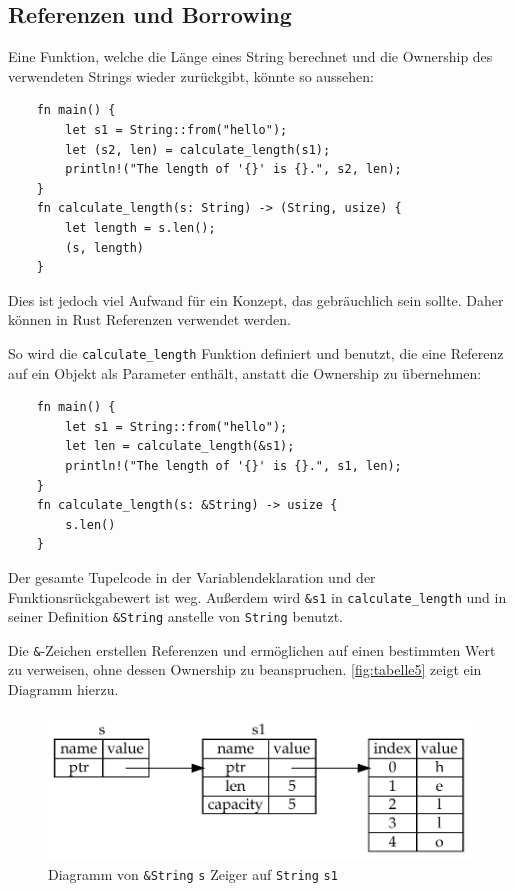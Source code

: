 \subsection{Referenzen und Borrowing}

Eine Funktion, welche die Länge eines String berechnet und die Ownership des verwendeten Strings wieder zurückgibt, könnte so aussehen:

\begin{lstlisting}
    fn main() {
        let s1 = String::from("hello");
        let (s2, len) = calculate_length(s1);
        println!("The length of '{}' is {}.", s2, len);
    }
    fn calculate_length(s: String) -> (String, usize) {
        let length = s.len();
        (s, length)
    }
\end{lstlisting}

Dies ist jedoch viel Aufwand für ein Konzept, das gebräuchlich sein sollte. Daher können in Rust Referenzen verwendet werden.

So wird die \verb"calculate_length" Funktion definiert und benutzt, die eine Referenz auf ein Objekt als Parameter enthält, anstatt die Ownership zu übernehmen:

\begin{lstlisting}
    fn main() {
        let s1 = String::from("hello");
        let len = calculate_length(&s1);
        println!("The length of '{}' is {}.", s1, len);
    }
    fn calculate_length(s: &String) -> usize {
        s.len()
    }
\end{lstlisting}

Der gesamte Tupelcode in der Variablendeklaration und der Funk\-ti\-ons\-rück\-ga\-be\-wert ist weg. Außerdem wird \verb"&s1" in \verb"calculate_length" und in seiner Definition \verb"&String" anstelle von \verb"String" benutzt.

Die \verb"&"-Zeichen erstellen Referenzen und ermöglichen auf einen bestimmten Wert zu verweisen, ohne dessen Ownership zu beanspruchen. \autoref{fig:tabelle5} zeigt ein Diagramm hierzu.

\begin{figure}[htbp]
    \centering
    \includegraphics[scale=0.9]{Programmierung/Tabelle5.pdf}
    \caption{Diagramm von \texttt{\&String} \texttt{s} Zeiger auf \texttt{String} \texttt{s1}}
    \label{fig:tabelle5}
\end{figure}

